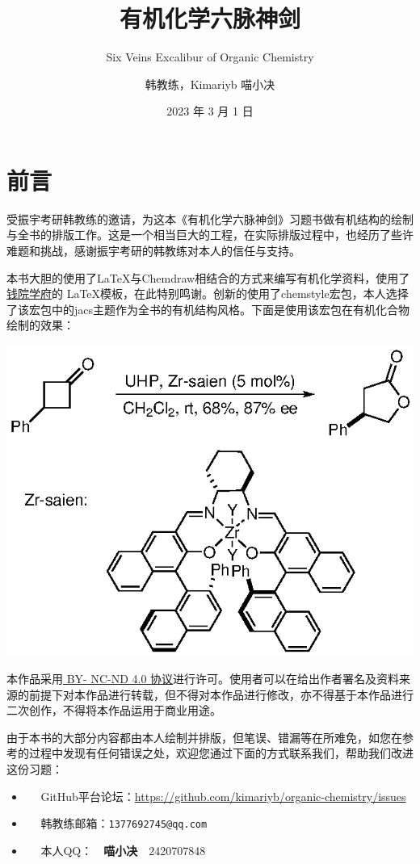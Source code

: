 \documentclass[
  10pt,
  twoside,
  openany,
  b5paper, %
  colorscheme = basic, %
]{qyxf-book}
\title{有机化学六脉神剑}
\subtitle{Six Veins Excalibur of Organic Chemistry }  %
\author{韩教练，Kimariyb 喵小决}
\date{2023 年 3 月 1 日}
\begin{document}
\maketitle

\chapter*{前言}

受振宇考研韩教练的邀请，为这本《有机化学六脉神剑》习题书做有机结构的绘制与全书的排版工作。这是一个相当巨大的工程，在实际排版过程中，也经历了些许难题和挑战，感谢振宇考研的韩教练对本人的信任与支持。

本书大胆的使用了\LaTeX 与Chemdraw相结合的方式来编写有机化学资料，使用了\href{https://github.com/qyxf/qyxf-book}{钱院学府}的 \LaTeX 模板，在此特别鸣谢。创新的使用了chemstyle宏包，本人选择了该宏包中的jacs主题作为全书的有机结构风格。下面是使用该宏包在有机化合物绘制的效果：

\begin{scheme}[ht]
	\includegraphics{eg/eg.eps}
	
\end{scheme}

本作品采用\href{https://
	creativecommons.org/licenses/
	by-nc-nd/4.0/}{ BY-
	NC-ND 4.0 协议}进行许可。使用者可以在给出作者署名及资料来源的前提下对本作品进行转载，但不得对本作品进行修改，亦不得基于本作品进行二次创作，不得将本作品运用于商业用途。

由于本书的大部分内容都由本人绘制并排版，但笔误、错漏等在所难免，如您在参考的过程中发现有任何错误之处，欢迎您通过下面的方式联系我们，帮助我们改进这份习题：
\begin{itemize}
	\item \faGithub ~~ GitHub平台论坛：\url{https://github.com/kimariyb/organic-chemistry/issues}
	\item \faEnvelopeOpen ~~ 韩教练邮箱：\texttt{1377692745@qq.com}
	\item \faQq ~~ 
	本人QQ：~~\textbf{喵小决}~~2420707848
\end{itemize}
\end{document}
